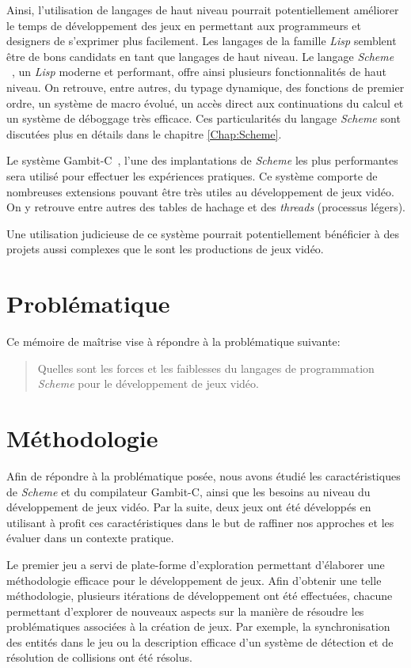 \documentclass[12pt,twoside,letterpaper,francais]{book}
\newcommand{\lisp}{{\textit{Lisp }}}
\newcommand{\Schemelang}{{\textit{Scheme }}}
\begin{document}
Ainsi, l'utilisation de langages de haut niveau pourrait
potentiellement améliorer le temps de développement des jeux en
permettant aux programmeurs et designers de s'exprimer plus
facilement. Les langages de la famille \lisp semblent être de bons
candidats en tant que langages de haut niveau. Le langage
\Schemelang~\cite{R5RS}, un \lisp moderne et performant, offre ainsi
plusieurs fonctionnalités de haut niveau. On retrouve, entre autres,
du typage dynamique, des fonctions de premier ordre, un système de
macro évolué, un accès direct aux continuations du calcul et un
système de déboggage très efficace. Ces particularités du langage
\Schemelang sont discutées plus en détails dans le chapitre
\ref{Chap:Scheme}.

Le système Gambit-C~\cite{Gambit4}, l'une des implantations de
\Schemelang les plus performantes~\cite{GAMBIT_BENCHMARKS} sera
utilisé pour effectuer les expériences pratiques. Ce système comporte
de nombreuses extensions pouvant être très utiles au développement de
jeux vidéo. On y retrouve entre autres des tables de hachage et des
\textit{threads} (processus légers).

Une utilisation judicieuse de ce système pourrait potentiellement
bénéficier à des projets aussi complexes que le sont les productions
de jeux vidéo.

\FloatBarrier
\section{Problématique}
Ce mémoire de maîtrise vise à répondre à la problématique suivante:
\begin{quote}
  Quelles sont les forces et les faiblesses du langages de
  programmation \Schemelang pour le développement de jeux vidéo.
\end{quote}

\FloatBarrier
\section{Méthodologie}
Afin de répondre à la problématique posée, nous avons étudié les
caractéristiques de \Schemelang et du compilateur Gambit-C, ainsi que
les besoins au niveau du développement de jeux vidéo. Par la suite,
deux jeux ont été développés en utilisant à profit ces
caractéristiques dans le but de raffiner nos approches et les évaluer
dans un contexte pratique.

Le premier jeu a servi de plate-forme d'exploration permettant
d'élaborer une méthodologie efficace pour le développement de
jeux. Afin d'obtenir une telle méthodologie, plusieurs itérations de
développement ont été effectuées, chacune permettant d'explorer de
nouveaux aspects sur la manière de résoudre les problématiques
associées à la création de jeux. Par exemple, la synchronisation des
entités dans le jeu ou la description efficace d'un système de
détection et de résolution de collisions ont été résolus.
\end{document}
